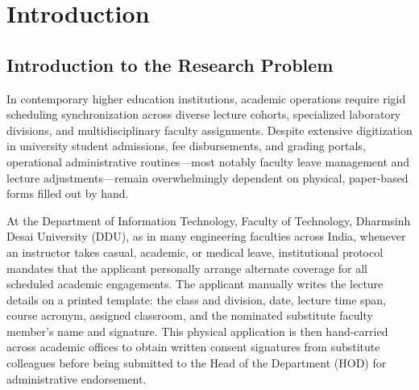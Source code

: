 \documentclass[12pt,letterpaper]{report}
\begin{document}
\newpage
{}
\setcounter{page}{1}

\chapter{Introduction}

\section{Introduction to the Research Problem}
In contemporary higher education institutions, academic operations require rigid scheduling synchronization across diverse lecture cohorts, specialized laboratory divisions, and multidisciplinary faculty assignments. Despite extensive digitization in university student admissions, fee disbursements, and grading portals, operational administrative routines---most notably faculty leave management and lecture adjustments---remain overwhelmingly dependent on physical, paper-based forms filled out by hand.

At the Department of Information Technology, Faculty of Technology, Dharmsinh Desai University (DDU), as in many engineering faculties across India, whenever an instructor takes casual, academic, or medical leave, institutional protocol mandates that the applicant personally arrange alternate coverage for all scheduled academic engagements. The applicant manually writes the lecture details on a printed template: the class and division, date, lecture time span, course acronym, assigned classroom, and the nominated substitute faculty member's name and signature. This physical application is then hand-carried across academic offices to obtain written consent signatures from substitute colleagues before being submitted to the Head of the Department (HOD) for administrative endorsement.
\end{document}
